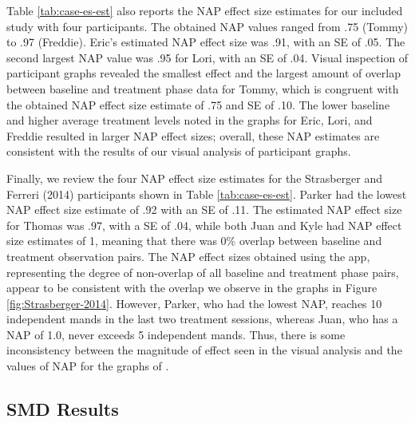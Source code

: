 \documentclass[
]{book}
\begin{document}
Table \ref{tab:case-es-est} also reports the NAP effect size estimates for our included \citet{Casey1978} study with four participants. The obtained NAP values ranged from .75 (Tommy) to .97 (Freddie). Eric's estimated NAP effect size was .91, with an SE of .05. The second largest NAP value was .95 for Lori, with an SE of .04. Visual inspection of \citet{Casey1978} participant graphs revealed the smallest effect and the largest amount of overlap between baseline and treatment phase data for Tommy, which is congruent with the obtained NAP effect size estimate of .75 and SE of .10. The lower baseline and higher average treatment levels noted in the graphs for Eric, Lori, and Freddie resulted in larger NAP effect sizes; overall, these NAP estimates are consistent with the results of our visual analysis of participant graphs.

Finally, we review the four NAP effect size estimates for the Strasberger and Ferreri (2014) participants shown in Table \ref{tab:case-es-est}. Parker had the lowest NAP effect size estimate of .92 with an SE of .11. The estimated NAP effect size for Thomas was .97, with a SE of .04, while both Juan and Kyle had NAP effect size estimates of 1, meaning that there was 0\% overlap between baseline and treatment observation pairs. The NAP effect sizes obtained using the app, representing the degree of non-overlap of all baseline and treatment phase pairs, appear to be consistent with the overlap we observe in the \citet{StrasbergerFerreri2014} graphs in Figure \ref{fig:Strasberger-2014}. However, Parker, who had the lowest NAP, reaches 10 independent mands in the last two treatment sessions, whereas Juan, who has a NAP of 1.0, never exceeds 5 independent mands. Thus, there is some inconsistency between the magnitude of effect seen in the visual analysis and the values of NAP for the graphs of \citet{StrasbergerFerreri2014}.

\hypertarget{smd-results}{%
\subsection{SMD Results}\label{smd-results}}
\end{document}
